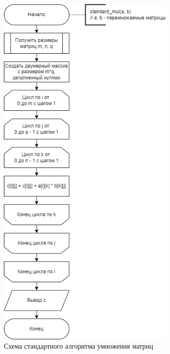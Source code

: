 \begin{figure}[h!btp]
	\centering
	\includegraphics[width=250pt]{inc/diagram-standard.png}
	\caption{Схема стандартного алгоритма умножения матриц}
	\label{fig:diagram-standard}	
\end{figure}
\clearpage


